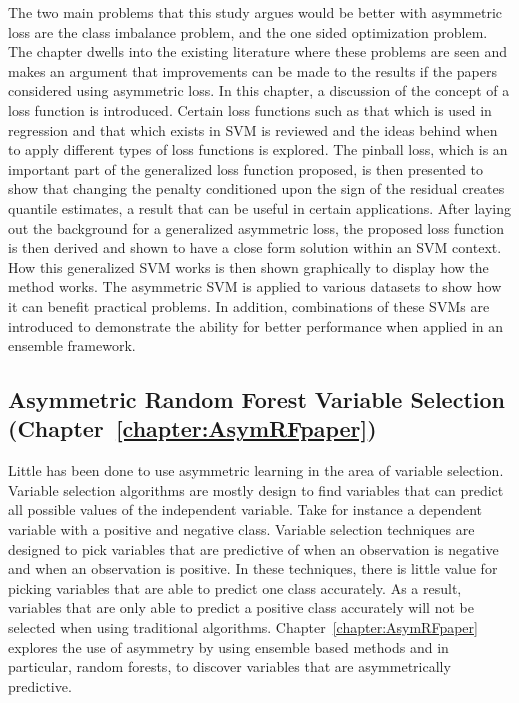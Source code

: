 The two main problems that this study argues would be better with asymmetric loss are the class imbalance problem, and the one sided optimization problem. The chapter dwells into the existing literature where these problems are seen and makes an argument that improvements can be made to the results if the papers considered using asymmetric loss. In this chapter, a discussion of the concept of a loss function is introduced. Certain loss functions such as that which is used in regression and that which exists in SVM is reviewed and the ideas behind when to apply different types of loss functions is explored. The pinball loss, which is an important part of the generalized loss function proposed, is then presented to show that changing the penalty conditioned upon the sign of the residual creates quantile estimates, a result that can be useful in certain applications. After laying out the background for a generalized asymmetric loss, the proposed loss function is then derived and shown to have a close form solution within an SVM context. How this generalized SVM works is then shown graphically to display how the method works. The asymmetric SVM is applied to various datasets to show how it can benefit practical problems. In addition, combinations of these SVMs are introduced to demonstrate the ability for better performance when applied in an ensemble framework. 

\subsection{Asymmetric Random Forest Variable Selection (Chapter~\ref{chapter:AsymRFpaper})}
Little has been done to use asymmetric learning in the area of variable selection. Variable selection algorithms are mostly design to find variables that can predict all possible values of the independent variable. Take for instance a dependent variable with a positive and negative class. Variable selection techniques are designed to pick variables that are predictive of when an observation is negative and when an observation is positive. In these techniques, there is little value for picking variables that are able to predict one class accurately. As a result, variables that are only able to predict a positive class accurately will not be selected when using traditional algorithms. Chapter~\ref{chapter:AsymRFpaper} explores the use of asymmetry by using ensemble based methods and in particular, random forests, to discover variables that are asymmetrically predictive. 


